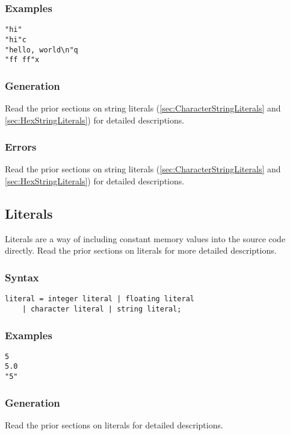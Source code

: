 \documentclass[10pt,a4paper]{article}
\begin{document}
\subsubsection{Examples}
\begin{verbatim}
"hi"
"hi"c
"hello, world\n"q
"ff ff"x
\end{verbatim}

\subsubsection{Generation}
Read the prior sections on string literals (\ref{sec:CharacterStringLiterals} and \ref{sec:HexStringLiterals}) for detailed descriptions.

\subsubsection{Errors}
Read the prior sections on string literals (\ref{sec:CharacterStringLiterals} and \ref{sec:HexStringLiterals}) for detailed descriptions.

\newpage




\subsection{Literals}
\label{sec:Literals}
Literals are a way of including constant memory values into the source code directly. Read the prior sections on literals for more detailed descriptions.

\subsubsection{Syntax}
\begin{verbatim}
literal = integer literal | floating literal 
    | character literal | string literal;
\end{verbatim}

\subsubsection{Examples}
\begin{verbatim}
5
5.0
"5"
\end{verbatim}

\subsubsection{Generation}
Read the prior sections on literals for detailed descriptions.
\end{document}
